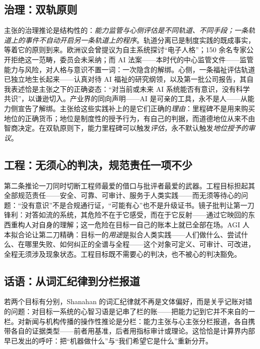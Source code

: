 \documentclass[10pt,fontset=fandol]{ctexart}
\begin{document}
\subsection{治理：双轨原则}\label{sec:governance}

主张的治理推论是结构性的：\emph{能力监管与心侧评估是不同轨道、不同手段；一条轨道上的事件不自动开启另一条轨道上的程序}。轨道分离已是制度实践的既成事实，等着它的原则到来。欧洲议会曾提议为自主系统探讨“电子人格”\cite{eu2017resolution}；150 余名专家公开拒绝这一范畴\cite{eu2018letter}，委员会未采纳；而 AI 法案——本时代的中心监管文件——监管能力与风险，对人格与意识不置一词\cite{euaiact2024}：一次隐含的解绑。心侧，一条福祉评估轨道已独立地生长起来——认真对待 AI 福祉的研究纲领\cite{long2024welfare}，以及第一批公司报告，其自我表述恰是主张之下的正确姿态：“对当前或未来 AI 系统能否有意识，没有科学共识”，以谦逊切入\cite{anthropic2025welfare}。产业界的同向声明——AI 是可亲的工具，永不是人\cite{suleyman2026personable}——从能力侧宣告了解绑。主张给这些实践补上的是它们正确的\emph{理由}：里程碑不是用来购买地位的正确货币；地位是制度性的授予行为，有自己的判据，而道德地位从来不由智商决定\cite{bostrom2014ethics,gunkel2018rights}。在双轨原则下，能力里程碑可以触发\emph{评估}，永不默认触发\emph{地位授予的审议}。

\subsection{工程：无须心的判决，规范责任一项不少}\label{sec:engineering}

第二条推论一刀同时切断工程师最爱的借口与批评者最爱的武器。工程目标担起其全部规范责任——安全、可靠、可审计、服务于人类实践——而无须等待心的问题：“没有意识”不是合规通行证，“可能有心”也不是升级证书。镜子批判让第一刀锋利：对答如流的系统，其危险不在于它感受，而在于它反射——通过它映回的东西重构人对自身的理解\cite{vallor2024mirror}；这一危险在目标一自己的账本上就已全部在场。AGI 人本拟合论让第二刀精确：目标一的\emph{用途}是拟合人类实践——人们做什么、尝试什么、在哪里失败、如何纠正的全谱与全程\cite{yu2026fitting,yu2026methodology}——这个对象可定义、可审计、可改进，全程无须涉及现象状态。工程目标既不需要心的判决，也不被心的判决豁免。

\subsection{话语：从词汇纪律到分栏报道}\label{sec:discourse}

若两个目标有分别，Shanahan 的词汇纪律\cite{shanahan2024talking}就不再是文体偏好，而是关乎记账对错的问题：对目标一系统的心智习语是记串了栏的账——把能力记到它并不来自的一栏。对新闻与机构传播的操作性推论是分栏：能力主张与心主张分栏报道，各自携带各自的证据类型——前者用基准，后者用指标审计或理论。这恰恰是计算界内部早已发出的呼吁：把“机器做什么”与“我们希望它是什么”重新分开\cite{jorge2026harsh}。
\end{document}
